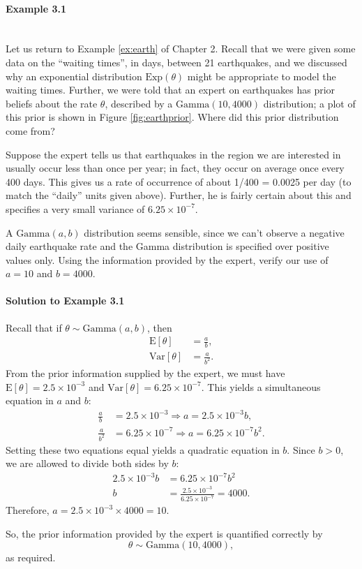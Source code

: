 \paragraph{Example 3.1}{~\\
\label{ex:earthret}
\noindent Let us return to Example \ref{ex:earth} of Chapter 2.  Recall that we were given some data on the ``waiting times'', in days, between 21 earthquakes, and we discussed why an exponential distribution $\text{Exp}(\theta)$ might be appropriate to model the waiting times.  Further, we were told that an expert on earthquakes has prior beliefs about the rate $\theta$, described by a $\text{Gamma}(10,4000)$ distribution; a plot of this prior is shown in Figure \ref{fig:earthprior}.  Where did this prior distribution come from?

Suppose the expert tells us that earthquakes in the region we are interested in usually occur less than once per year; in fact, they occur on average once every 400 days.  This gives us a rate of occurrence of about 1/400 = 0.0025 per day (to match the ``daily'' units given above).  Further, he is fairly certain about this and specifies a very small variance of $6.25 \times 10^{-7}$.  

A $\text{Gamma}(a,b)$ distribution seems sensible, since we can't observe a negative daily earthquake rate and the Gamma distribution is specified over positive values only.  Using the information provided by the expert, verify our use of $a=10$ and $b=4000$.}

\paragraph{Solution to Example 3.1}{
    
    Recall that if $\theta \sim \text{Gamma}(a,b)$, then
    \begin{align*}
        \text{E}[\theta] &= \frac{a}{b}, \\
        \text{Var}[\theta] &= \frac{a}{b^2}.
    \end{align*}
    From the prior information supplied by the expert, we must have $\text{E}[\theta] = 2.5\times 10^{-3}$ and $\text{Var}[\theta] = 6.25\times 10^{-7}$. This yields a simultaneous equation in $a$ and $b$:
    \begin{align*}
        \frac{a}{b} &= 2.5\times 10^{-3} \Rightarrow a = 2.5\times 10^{-3} b, \\
        \frac{a}{b^2} &= 6.25\times 10^{-7} \Rightarrow a = 6.25\times 10^{-7}b^2.
    \end{align*}
    Setting these two equations equal yields a quadratic equation in $b$. Since $b > 0$, we are allowed to divide both sides by $b$:
    \begin{align*}
        2.5\times 10^{-3} b &= 6.25\times 10^{-7}b^2 \\
        b &= \frac{2.5\times 10^{-3}}{ 6.25\times 10^{-7}} = 4000.
    \end{align*}
    Therefore, $a = 2.5\times 10^{-3} \times 4000 = 10$.

    So, the prior information provided by the expert is quantified correctly by $$\theta\sim\text{Gamma}(10, 4000),$$ as required.
    
}


